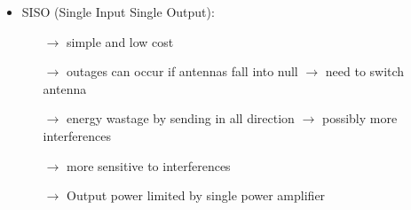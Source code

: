 \begin{itemize}
\begin{itemize}
    \end{itemize}
    \item SISO (Single Input Single Output):
    \begin{itemize}
        \item[$\rightarrow$] simple and low cost
        \item[$\rightarrow$] outages can occur if antennas fall into null $\rightarrow$ need to switch antenna
        \item[$\rightarrow$] energy wastage by sending in all direction $\rightarrow$ possibly more interferences
        \item[$\rightarrow$] more sensitive to interferences
        \item[$\rightarrow$] Output power limited by single power amplifier
    \end{itemize}
\end{itemize}